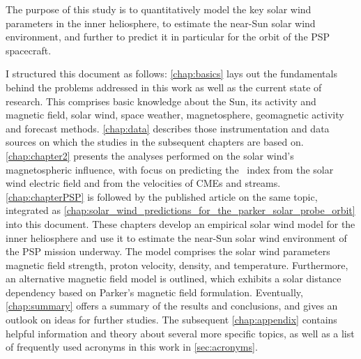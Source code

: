 The purpose of this study is to quantitatively model the key solar wind parameters in the inner heliosphere, to estimate the near-Sun solar wind environment, and further to predict it in particular for the orbit of the PSP spacecraft.

\bigskip

I structured this document as follows: \autoref{chap:basics} lays out the fundamentals behind the problems addressed in this work as well as the current state of research. This comprises basic knowledge about the Sun, its activity and magnetic field, solar wind, space weather, magnetosphere, geomagnetic activity and forecast methods. \autoref{chap:data} describes those instrumentation and data sources on which the studies in the subsequent chapters are based on. \autoref{chap:chapter2} presents the analyses performed on the solar wind's magnetospheric influence, with focus on predicting the \Kp~index from the solar wind electric field and from the velocities of CMEs and streams. \autoref{chap:chapterPSP} is followed by the published article on the same topic, integrated as \autoref{chap:solar_wind_predictions_for_the_parker_solar_probe_orbit} into this document. These chapters develop an empirical solar wind model for the inner heliosphere and use it to estimate the near-Sun solar wind environment of the PSP mission underway. The model comprises the solar wind parameters magnetic field strength, proton velocity, density, and temperature. Furthermore, an alternative magnetic field model is outlined, which exhibits a solar distance dependency based on Parker's magnetic field formulation. Eventually, \autoref{chap:summary} offers a summary of the results and conclusions, and gives an outlook on ideas for further studies. The subsequent \autoref{chap:appendix} contains helpful information and theory about several more specific topics, as well as a list of frequently used acronyms in this work in \autoref{sec:acronyms}.


